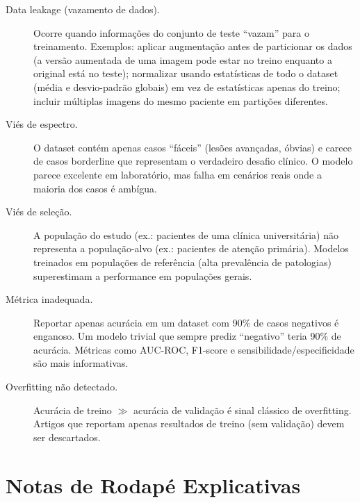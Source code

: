 \begin{description}
    \item[Data leakage (vazamento de dados).] Ocorre quando informações do conjunto de teste ``vazam'' para o treinamento. Exemplos: aplicar augmentação antes de particionar os dados (a versão aumentada de uma imagem pode estar no treino enquanto a original está no teste); normalizar usando estatísticas de todo o dataset (média e desvio-padrão globais) em vez de estatísticas apenas do treino; incluir múltiplas imagens do mesmo paciente em partições diferentes.
    
    \item[Viés de espectro.] O dataset contém apenas casos ``fáceis'' (lesões avançadas, óbvias) e carece de casos borderline que representam o verdadeiro desafio clínico. O modelo parece excelente em laboratório, mas falha em cenários reais onde a maioria dos casos é ambígua.
    
    \item[Viés de seleção.] A população do estudo (ex.: pacientes de uma clínica universitária) não representa a população-alvo (ex.: pacientes de atenção primária). Modelos treinados em populações de referência (alta prevalência de patologias) superestimam a performance em populações gerais.
    
    \item[Métrica inadequada.] Reportar apenas acurácia em um dataset com 90\% de casos negativos é enganoso. Um modelo trivial que sempre prediz ``negativo'' teria 90\% de acurácia. Métricas como AUC-ROC, F1-score e sensibilidade/especificidade são mais informativas.
    
    \item[Overfitting não detectado.] Acurácia de treino $\gg$ acurácia de validação é sinal clássico de overfitting. Artigos que reportam apenas resultados de treino (sem validação) devem ser descartados.
\end{description}

\section{Notas de Rodapé Explicativas}


